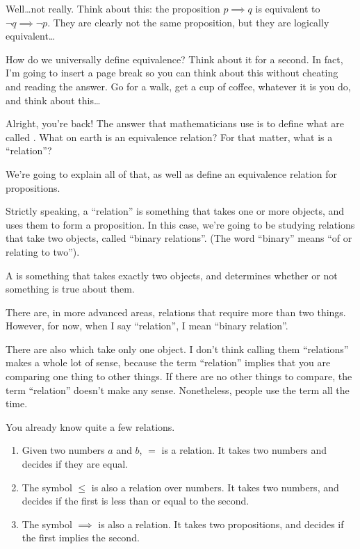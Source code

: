 Well\dots not really. Think about this: the proposition $p \implies q$
is equivalent to $\lnot q \implies \lnot p$. They are clearly not the
same proposition, but they are logically equivalent\dots

How do we universally define equivalence? Think about it for a
second. In fact, I'm going to insert a page break so you can think
about this without cheating and reading the answer. Go for a walk, get
a cup of coffee, whatever it is you do, and think about this\dots

\newpage

Alright, you're back! The answer that mathematicians use is to define
what are called . What on earth is an
equivalence relation? For that matter, what is a ``relation''?

We're going to explain all of that, as well as define an equivalence
relation for propositions.

Strictly speaking, a ``relation'' is something that takes one or more
objects, and uses them to form a proposition. In this case, we're
going to be studying relations that take two objects, called ``binary
relations''. (The word ``binary'' means ``of or relating to two'').

\begin{definition}
  A  is something that takes exactly two
  objects, and determines whether or not something is true about them.
\end{definition}

There are, in more advanced areas, relations that require more than
two things. However, for now, when I say ``relation'', I mean
``binary relation''.

\begin{aside}
  There are also  which take only one object. I
  don't think calling them ``relations'' makes a whole lot of sense,
  because the term ``relation'' implies that you are comparing one
  thing  to other things. If there are no other things
  to compare, the term ``relation'' doesn't make any
  sense. Nonetheless, people use the term all the time.
\end{aside}

You already know quite a few relations.

\begin{enumerate}
\item Given two numbers $a$ and $b$, $=$ is a relation. It takes two
  numbers and decides if they are equal.
\item The symbol $\le$ is also a relation over numbers. It takes two
  numbers, and decides if the first is less than or equal to the
  second.
\item The symbol $\implies$ is also a relation. It takes two
  propositions, and decides if the first implies the second.
\end{enumerate}

